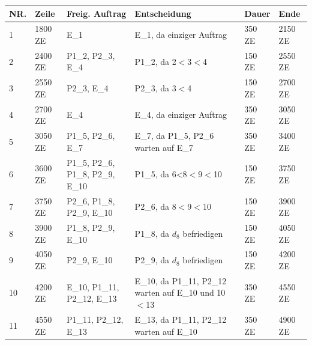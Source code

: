 \documentclass[13pt,a4paper, listof=entryprefix, bibliography=totocnumbered,toc=listofnumbered,lof=listofnumbered]{scrartcl}
\begin{document}
\begin{tabularx}{\linewidth}{|p{0.6cm}|p{}|>{\raggedright}p{}|>{\raggedright}p{5cm}|X|X|}
	\nobreakhline
	\caption{Beispieltabelle mit Umbruch und Wiederholen des Tabellenkopfes.} \endfoot
	\hline %
	NR. & Zeile   & Freig. Auftrag                        & Entscheidung                                          & Dauer  & Ende    \\ \hline
	\endhead
	1   & 1800 ZE & E\_1                                  & E\_1, da einziger Auftrag                             & 350 ZE & 2150 ZE \\
	2   & 2400 ZE & P1\_2, P2\_3, E\_4                    & P1\_2, da 2$<$3$<$4                                   & 150 ZE & 2550 ZE \\
	3   & 2550 ZE & P2\_3, E\_4                           & P2\_3, da 3$<$4                                       & 150 ZE & 2700 ZE \\
	4   & 2700 ZE & E\_4                                  & E\_4, da einziger Auftrag                             & 350 ZE & 3050 ZE \\
	5   & 3050 ZE & P1\_5, P2\_6, E\_7                    & E\_7, da P1\_5, P2\_6 warten auf E\_7                 & 350 ZE & 3400 ZE \\
	6   & 3600 ZE & P1\_5, P2\_6, P1\_8, P2\_9, E\_10     & P1\_5, da $6$<8$<$9$<$10                              & 150 ZE & 3750 ZE \\
	7   & 3750 ZE & P2\_6, P1\_8, P2\_9, E\_10            & P2\_6, da 8$<$9$<$10                                  & 150 ZE & 3900 ZE \\
	8   & 3900 ZE & P1\_8, P2\_9, E\_10                   & P1\_8, da $d_{8}$ befriedigen                         & 150 ZE & 4050 ZE \\
	9   & 4050 ZE & P2\_9, E\_10                          & P2\_9, da $d_{8}$ befriedigen                         & 150 ZE & 4200 ZE \\
	10  & 4200 ZE & E\_10, P1\_11, P2\_12, E\_13          & E\_10, da P1\_11, P2\_12 warten auf E\_10 und 10$<$13 & 350 ZE & 4550 ZE \\
	11  & 4550 ZE & P1\_11, P2\_12, E\_13                 & E\_13, da P1\_11, P2\_12 warten auf E\_10             & 350 ZE & 4900 ZE \\

\end{tabularx}
\end{document}
